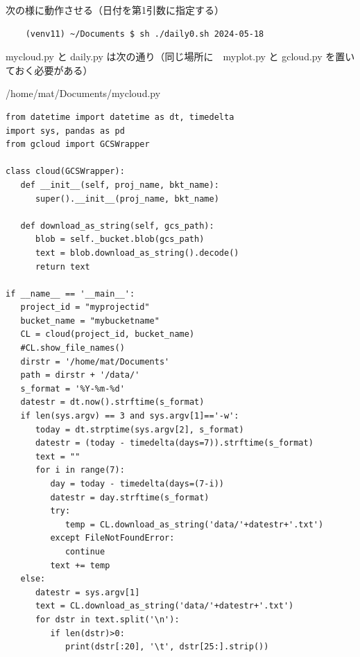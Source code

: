 \documentclass[12pt,a4paper,uplatex]{jsbook}
\begin{document}
次の様に動作させる（日付を第1引数に指定する）

\begin{screen}
\begin{verbatim}
	(venv11) ~/Documents $ sh ./daily0.sh 2024-05-18
\end{verbatim}
\end{screen}

mycloud.py と daily.py は次の通り（同じ場所に　myplot.py と gcloud.py を置いておく必要がある）

\begin{spacing}{0.87}
\begin{itembox}[l]{/home/mat/Documents/mycloud.py}
	\begin{verbatim}
from datetime import datetime as dt, timedelta
import sys, pandas as pd
from gcloud import GCSWrapper

class cloud(GCSWrapper):
   def __init__(self, proj_name, bkt_name):
      super().__init__(proj_name, bkt_name)

   def download_as_string(self, gcs_path):
      blob = self._bucket.blob(gcs_path)
      text = blob.download_as_string().decode()
      return text

if __name__ == '__main__':
   project_id = "myprojectid"
   bucket_name = "mybucketname"
   CL = cloud(project_id, bucket_name)
   #CL.show_file_names()
   dirstr = '/home/mat/Documents'
   path = dirstr + '/data/'
   s_format = '%Y-%m-%d'
   datestr = dt.now().strftime(s_format)
   if len(sys.argv) == 3 and sys.argv[1]=='-w':
      today = dt.strptime(sys.argv[2], s_format)
      datestr = (today - timedelta(days=7)).strftime(s_format)
      text = ""
      for i in range(7):
         day = today - timedelta(days=(7-i))
         datestr = day.strftime(s_format)
         try:
            temp = CL.download_as_string('data/'+datestr+'.txt')
         except FileNotFoundError:
            continue
         text += temp   
   else:
      datestr = sys.argv[1]
      text = CL.download_as_string('data/'+datestr+'.txt')
      for dstr in text.split('\n'):
         if len(dstr)>0:
            print(dstr[:20], '\t', dstr[25:].strip())
   \end{verbatim}
\end{itembox}
   \end{spacing}
\end{document}
